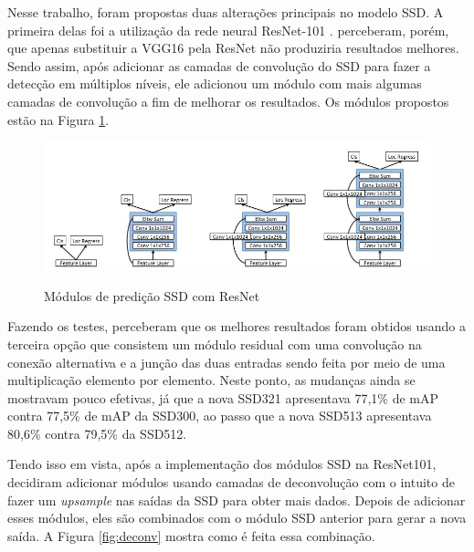 Nesse trabalho, foram propostas duas alterações principais no modelo \ac{SSD}. A primeira delas foi a utilização da rede neural ResNet-101 \cite{he-2016}.  perceberam, porém, que apenas substituir a VGG16 pela \ac{ResNet} não produziria resultados melhores. Sendo assim, após adicionar as camadas de convolução do \ac{SSD} para fazer a detecção em múltiplos níveis, ele adicionou um módulo com mais algumas camadas de convolução a fim de melhorar os resultados. Os módulos propostos estão na Figura \ref{fig:ssdpred}.

\begin{figure}[H]
	\setlength{\abovecaptionskip}{0pt}
	\setlength{\belowcaptionskip}{0pt}
	\caption[Módulos de predição SSD com ResNet]{Módulos de predição \ac{SSD} com \ac{ResNet}}
	\centering
	\includegraphics[width=.8\textwidth]{imagem/0x_dssdpredmod.jpg}
	\captionsetup{justification=centering}
	\label{fig:ssdpred}
\end{figure}

Fazendo os testes,  perceberam que os melhores resultados foram obtidos usando a terceira opção que consistem um módulo residual com uma convolução na conexão alternativa e a junção das duas entradas sendo feita por meio de uma multiplicação elemento por elemento. Neste ponto, as mudanças ainda se mostravam pouco efetivas, já que a nova \ac{SSD}321 apresentava 77,1\% de \ac{mAP} contra 77,5\% de \ac{mAP} da \ac{SSD}300, ao passo que a nova \ac{SSD}513 apresentava 80,6\% contra 79,5\% da \ac{SSD}512.

Tendo isso em vista, após a implementação dos módulos \ac{SSD} na \ac{ResNet}101,  decidiram adicionar módulos usando camadas de deconvolução com o intuito de fazer um \textit{upsample} nas saídas da \ac{SSD} para obter mais dados. Depois de adicionar esses módulos, eles são combinados com o módulo \ac{SSD} anterior para gerar a nova saída. A Figura \ref{fig:deconv} mostra como é feita essa combinação.

